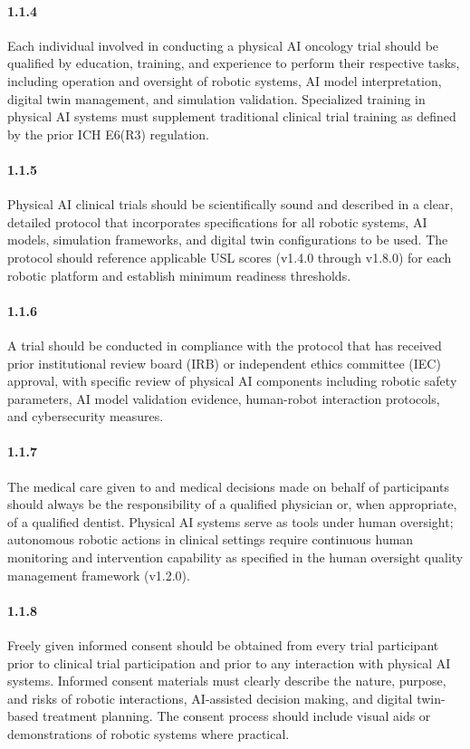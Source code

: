 \documentclass[11pt]{article}
\begin{document}
\paragraph{1.1.4} Each individual involved in conducting a physical AI oncology trial should be qualified by education, training, and experience to perform their respective tasks, including operation and oversight of robotic systems, AI model interpretation, digital twin management, and simulation validation. Specialized training in physical AI systems must supplement traditional clinical trial training as defined by the prior ICH E6(R3) regulation.

\paragraph{1.1.5} Physical AI clinical trials should be scientifically sound and described in a clear, detailed protocol that incorporates specifications for all robotic systems, AI models, simulation frameworks, and digital twin configurations to be used. The protocol should reference applicable USL scores (v1.4.0 through v1.8.0) for each robotic platform and establish minimum readiness thresholds.

\paragraph{1.1.6} A trial should be conducted in compliance with the protocol that has received prior institutional review board (IRB) or independent ethics committee (IEC) approval, with specific review of physical AI components including robotic safety parameters, AI model validation evidence, human-robot interaction protocols, and cybersecurity measures.

\paragraph{1.1.7} The medical care given to and medical decisions made on behalf of participants should always be the responsibility of a qualified physician or, when appropriate, of a qualified dentist. Physical AI systems serve as tools under human oversight; autonomous robotic actions in clinical settings require continuous human monitoring and intervention capability as specified in the human oversight quality management framework (v1.2.0).

\paragraph{1.1.8} Freely given informed consent should be obtained from every trial participant prior to clinical trial participation and prior to any interaction with physical AI systems. Informed consent materials must clearly describe the nature, purpose, and risks of robotic interactions, AI-assisted decision making, and digital twin-based treatment planning. The consent process should include visual aids or demonstrations of robotic systems where practical.
\end{document}
